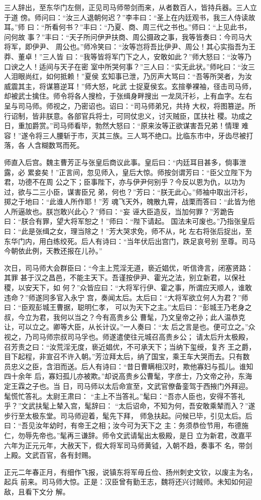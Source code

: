 三人辞出，至东华门左侧，正见司马师带剑而来，从者数百人，皆持兵器。三人立于道
傍。师问曰：“汝三人退朝何迟？”李丰曰：“圣上在内廷观书，我三人侍读故耳。”师
曰：“所看何书？”丰曰：“乃夏、商、周三代之书也。”师曰：“上见此书，问何故
事？”丰曰：“天子所问伊尹扶商、周公摄政之事，我等皆奏曰：今司马大将军，即伊尹、
周公也。”师冷笑曰：“汝等岂将吾比伊尹、周公！其心实指吾为王莽、董卓！”三人皆
曰：“我等皆将军门下之人，安敢如此？”师大怒曰：“汝等乃口谀之人！适间与天子在密
室中所哭何事？”三人曰：“实无此状。”师叱曰：“汝三人泪眼尚红，如何抵赖！”夏侯
玄知事已泄，乃厉声大骂曰：“吾等所哭者，为汝威震其主，将谋篡逆耳！”师大怒，叱武
士捉夏侯玄。玄揎拳裸袖，径击司马师，却被武士擒住。师令将各人搜检，于张缉身畔搜出
一龙凤汗衫，上有血字。左右呈与司马师。师视之，乃密诏也。诏曰：“司马师弟兄，共持
大权，将图篡逆。所行诏制，皆非朕意。各部官兵将士，可同仗忠义，讨灭贼臣，匡扶社
稷。功成之日，重加爵赏。”司马师看毕，勃然大怒曰：“原来汝等正欲谋害吾兄弟！情理
难容！”遂令将三人腰斩于市，灭其三族。三人骂不绝口。比临东市中，牙齿尽被打落，各
人含糊数骂而死。

师直入后宫。魏主曹芳正与张皇后商议此事。皇后曰：“内廷耳目甚多，倘事泄露，必
累妾矣！”正言间，忽见师入，皇后大惊。师按剑谓芳曰：“臣父立陛下为君，功德不在周
公之下；臣事陛下，亦与伊尹何别乎？今反以恩为仇，以功为过，欲与二三小臣，谋害臣兄
弟，何也？”芳曰：“朕无此心。”师袖中取出汗衫，掷之于地曰：“此谁人所作耶！”芳
魂飞天外，魄散九霄，战栗而答曰：“此皆为他人所逼故也。朕岂敢兴此心？”师曰：“妄
诬大臣造反，当加何罪？”芳跪告曰：“朕合有罪，望大将军恕之！”师曰：“陛下请起。
国法未可废也。”乃指张皇后曰：“此是张缉之女，理当除之！”芳大哭求免，师不从，叱
左右将张后捉出，至东华门内，用白练绞死。后人有诗曰：“当年伏后出宫门，跌足哀号别
至尊。司马今朝依此例，天教还报在儿孙。”

次日，司马师大会群臣曰：“今主上荒淫无道，亵近娼优，听信谗言，闭塞贤路：其罪
甚于汉之昌邑，不能主天下。吾谨按伊尹、霍光之法，别立新君，以保社稷，以安天下，如
何？”众皆应曰：“大将军行伊、霍之事，所谓应天顺人，谁敢违命？”师遂同多官入永宁
宫，奏闻太后。太后曰：“大将军欲立何人为君？”师曰：“臣观彭城王曹据，聪明仁孝，
可以为天下之主。”太后曰：“彭城王乃老身之叔，今立为君，我何以当之？今有高贵乡公
曹髦，乃文皇帝之孙；此人温恭克让，可以立之。卿等大臣，从长计议。”一人奏曰：“太
后之言是也。便可立之。”众视之，乃司马师宗叔司马孚也。师遂遣使往元城召高贵乡公；
请太后升太极殿，召芳责之曰：“汝荒淫无度，亵近娼优，不可承天下；当纳下玺绶，复齐
王之爵，目下起程，非宣召不许入朝。”芳泣拜太后，纳了国宝，乘王车大哭而去。只有数
员忠义之臣，含泪而送。后人有诗曰：“昔日曹瞒相汉时，欺他寡妇与孤儿。谁知四十余年
后，寡妇孤儿亦被欺。”却说高贵乡公曹髦，字彦士，乃文帝之孙，东海定王霖之子也。当
日，司马师以太后命宣至，文武官僚备銮驾于西掖门外拜迎。髦慌忙答礼。太尉王肃曰：
“主上不当答礼。”髦曰：“吾亦人臣也，安得不答礼乎？”文武扶髦上辇入宫，髦辞曰：
“太后诏命，不知为何，吾安敢乘辇而入？”遂步行至太极东堂。司马师迎着，髦先下拜，
师急扶起。问候已毕，引见太后。后曰：“吾见汝年幼时，有帝王之相；汝今可为天下之
主：务须恭俭节用，布德施仁，勿辱先帝也。”髦再三谦辞。师令文武请髦出太极殿，是日
立为新君，改嘉平六年为正元元年，大赦天下，假大将军司马师黄钺，入朝不趋，奏事不
名，带剑上殿。文武百官，各有封赐。

正元二年春正月，有细作飞报，说镇东将军毋丘俭、扬州刺史文钦，以废主为名，起兵
前来。司马师大惊。正是：汉臣曾有勤王志，魏将还兴讨贼师。未知如何迎敌，且看下文分
解。